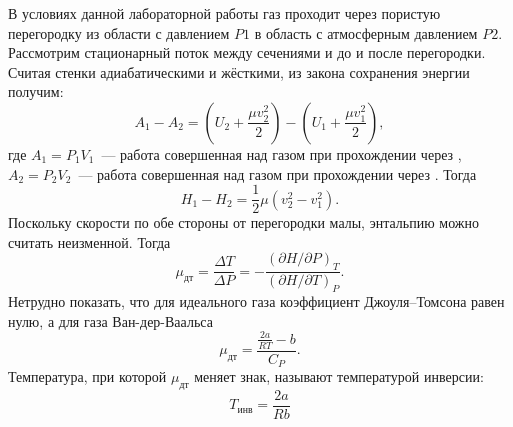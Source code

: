 \documentclass[a4paper,12pt]{article} %
\newcommand{\RomanNumeralCaps}[1]
{\MakeUppercase{\romannumeral #1}}
\begin{document}
\noindent В условиях данной лабораторной работы газ проходит через пористую
перегородку из области с давлением $ P1 $ в область с атмосферным давлением 
$ P2 $. Рассмотрим стационарный поток между сечениями \RomanNumeralCaps{1}
и \RomanNumeralCaps{2} до и после перегородки. Считая стенки
адиабатическими и жёсткими, из закона сохранения энергии получим: 
\begin{equation}\label{}
	A_1-A_2=
	\left(U_2+\dfrac{\mu v_2^2}{2}\right)-
	\left(U_1+\dfrac{\mu v_1^2}{2}\right),
\end{equation}
где $ A_1=P_1V_1 $~--- работа совершенная над газом при прохождении
через \RomanNumeralCaps{1}, $ A_2=P_2V_2 $~--- работа совершенная над
газом при прохождении через \RomanNumeralCaps{2}. Тогда
\begin{equation}\label{}
	H_1-H_2=\dfrac{1}{2}\mu(v_2^2-v_1^2).
\end{equation}
Поскольку скорости по обе стороны от перегородки малы, энтальпию можно
считать неизменной. Тогда 
\begin{equation}\label{}
	\mu_{дт}=\dfrac{\Delta T}{\Delta P}=
	-\dfrac{(\partial H/\partial P)_T}{(\partial H/\partial T)_P}.
\end{equation}
Нетрудно показать, что для идеального газа коэффициент Джоуля–Томсона равен
нулю, а для газа Ван-дер-Ваальса 
\begin{equation}\label{}
	\mu_{дт}=\dfrac{\frac{2a}{RT}-b}{C_P}.
\end{equation}
Температура, при которой $ \mu_{дт} $ меняет знак, называют температурой
инверсии: 
\begin{equation}\label{}
	T_{инв}=\dfrac{2a}{Rb}
\end{equation}
\end{document}
